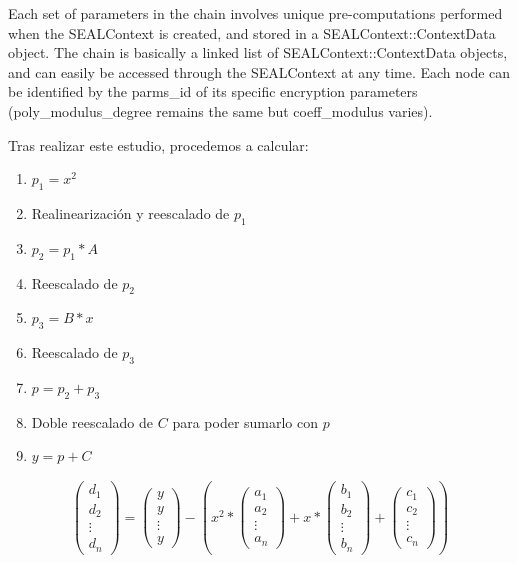 \begin{enumerate}
      Each set of parameters in the chain involves unique pre-computations performed
      when the SEALContext is created, and stored in a SEALContext::ContextData
      object. The chain is basically a linked list of SEALContext::ContextData
      objects, and can easily be accessed through the SEALContext at any time. Each
      node can be identified by the parms_id of its specific encryption parameters
      (poly_modulus_degree remains the same but coeff_modulus varies).
    \fi

    Tras realizar este estudio, procedemos a calcular:
    \begin{enumerate}
        \item $p_1 = x^2$
        \item Realinearización y reescalado de $p_1$
        \item $p_2 = p_1 * A$
        \item Reescalado de $p_2$
        \item $p_3 = B*x$
        \item Reescalado de $p_3$
        \item $p = p_2 + p_3$
        \item Doble reescalado de $C$ para poder sumarlo con $p$
        \item $y = p + C$
    \end{enumerate}

    \begin{gather}
      \label{form:distancias_seal}
        \begin{pmatrix}
            d_1 \\
            d_2 \\
            \vdots{} \\
            d_n
        \end{pmatrix}
        =
        \begin{pmatrix}
            y \\
            y \\
            \vdots{} \\
            y
        \end{pmatrix}
        - (x^2 *
        \begin{pmatrix}
            a_1 \\
            a_2 \\
            \vdots{} \\
            a_n
        \end{pmatrix}
        + x *
        \begin{pmatrix}
            b_1 \\
            b_2 \\
            \vdots{} \\
            b_n
        \end{pmatrix}
        +
        \begin{pmatrix}
            c_1 \\
            c_2 \\
            \vdots{} \\
            c_n
        \end{pmatrix}
        )
    \end{gather}


\end{enumerate}
